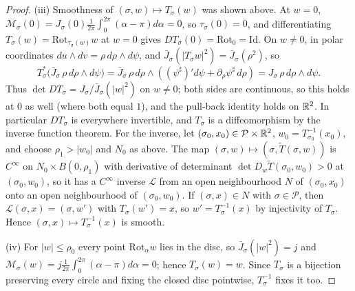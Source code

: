 \begin{proof}
(iii) Smoothness of $(\sigma,w)\mapsto T_\sigma(w)$ was shown above. At $w=0$,
$\mathcal M_\sigma(0)=J_\sigma(0)\frac1{2\pi}\int_0^{2\pi}(\alpha-\pi)d\alpha=0$, so $\tau_\sigma(0)=0$, and
differentiating $T_\sigma(w)=\mathrm{Rot}_{\tau_\sigma(w)}w$ at $w=0$ gives
$DT_\sigma(0)=\mathrm{Rot}_0=\mathrm{Id}$. On $w\ne0$, in polar coordinates $du\wedge dv=\rho\,d\rho\wedge d\psi$,
and $\bar J_\sigma(|T_\sigma w|^2)=\bar J_\sigma(\rho^2)$, so
\[
 T_\sigma^*\bigl(\bar J_\sigma\,\rho\,d\rho\wedge d\psi\bigr)=\bar J_\sigma\,\rho\,d\rho\wedge((\psi^\sharp)'d\psi+\partial_\rho\psi^\sharp\,d\rho)
 =J_\sigma\,\rho\,d\rho\wedge d\psi .
\]
Thus $\det DT_\sigma=J_\sigma/\bar J_\sigma(|w|^2)$ on $w\ne0$; both sides are continuous, so this holds at $0$
as well (where both equal $1$), and the pull-back identity holds on $\mathbb{R}^2$. In particular $DT_\sigma$ is
everywhere invertible, and $T_\sigma$ is a diffeomorphism by the inverse function theorem. For the inverse,
let $(\sigma_0,x_0)\in\mathcal P\times\mathbb{R}^2$, $w_0=T_{\sigma_0}^{-1}(x_0)$, and choose $\rho_1>|w_0|$ and
$N_0$ as above. The map $(\sigma,w)\mapsto(\sigma,\tilde T(\sigma,w))$ is $C^\infty$ on
$N_0\times B(0,\rho_1)$ with derivative of determinant $\det D_w\tilde T(\sigma_0,w_0)>0$ at $(\sigma_0,w_0)$, so it
has a $C^\infty$ inverse $\mathcal L$ from an open neighbourhood $N$ of $(\sigma_0,x_0)$ onto an open
neighbourhood of $(\sigma_0,w_0)$. If $(\sigma,x)\in N$ with $\sigma\in\mathcal P$, then
$\mathcal L(\sigma,x)=(\sigma,w')$ with $T_\sigma(w')=x$, so $w'=T_\sigma^{-1}(x)$ by injectivity of $T_\sigma$.
Hence $(\sigma,x)\mapsto T_\sigma^{-1}(x)$ is smooth.

(iv) For $|w|\le\rho_0$ every point $\mathrm{Rot}_\alpha w$ lies in the disc, so $\bar J_\sigma(|w|^2)=j$ and
$\mathcal M_\sigma(w)=j\frac1{2\pi}\int_0^{2\pi}(\alpha-\pi)d\alpha=0$; hence $T_\sigma(w)=w$. Since $T_\sigma$ is a
bijection preserving every circle and fixing the closed disc pointwise, $T_\sigma^{-1}$ fixes it too.
\end{proof}


